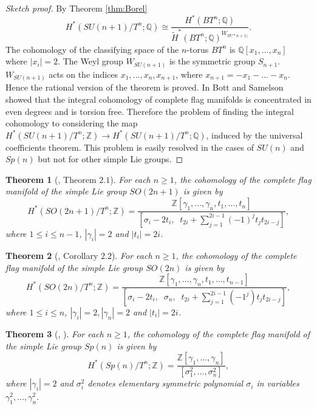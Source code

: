 \documentclass{article}
\theoremstyle{plain}
\newtheorem{thm}{Theorem}[section]
\theoremstyle{definition}
\numberwithin{thm}{section}
\begin{document}
		\begin{proof}[Sketch proof]
			By Theorem \ref{thm:Borel}
			\begin{equation*}
				H^*(SU(n+1)/T^n;\mathbb{Q})\cong \frac{H^*(BT^n;\mathbb{Q})}{\tilde{H}^*(BT^n;\mathbb{Q})^{W_{SU*n+1)}}}.
			\end{equation*}
			The cohomology of the classifying space of the $n$-torus $BT^n$ is $\mathbb{Q}[x_1,\dots,x_n]$ where $|x_i|=2$.
			The Weyl group $W_{SU(n+1)}$ is the symmetric group $S_{n+1}$.
			$W_{SU(n+1)}$ acts on the indices $x_1,\dots,x_n,x_{n+1}$, where $x_{n+1}=-x_1-\dots-x_n$.
			Hence the rational version of the theorem is proved.
			In \cite{AplicationsOfMorse} Bott and Samelson showed that the integral cohomology of complete flag manifolds is concentrated in even degrees and is torsion free.
			Therefore the problem of finding the integral cohomology to considering the map $H^*(SU(n+1)/T^n;\mathbb{Z})\to H^*(SU(n+1)/T^n;\mathbb{Q})$,
			induced by the universal coefficients theorem.
			This problem is easily resolved in the cases of $SU(n)$ and $Sp(n)$ but not for other simple Lie groups.
		\end{proof}

		\begin{thm}[\cite{toda1974}, Theorem $2.1$]\label{thm:H*SUodd}
			For each $n\geq 1$, the cohomology of the complete flag manifold of the simple Lie group $SO(2n+1)$ is given by
			\begin{equation*}
				H^*(SO(2n+1)/T^n;\mathbb{Z})=\frac{\mathbb{Z}[\gamma_1,\dots,\gamma_n,t_1,\dots,t_n]}{[\sigma_i-2t_i, \;\; t_{2i}+\sum_{j=1}^{2i-1}(-1)^jt_jt_{2i-j}]},
			\end{equation*}
			where $1\leq i \leq n-1$, $|\gamma_i|=2$ and $|t_i|=2i$.
		\end{thm}
	
		\begin{thm}[\cite{toda1974}, Corollary $2.2$]\label{thm:H*SOeven}
			For each $n\geq 1$, the cohomology of the complete flag manifold of the simple Lie group $SO(2n)$ is given by
			\begin{equation*}
				H^*(SO(2n)/T^n;\mathbb{Z})=
				\frac{\mathbb{Z}[\gamma_1,\dots,\gamma_n,t_1,\dots,t_{n-1}]}{[\sigma_i-2t_i, \;\; \sigma_n, \;\; t_{2i}+\sum_{j=1}^{2i-1}(-1^j)t_jt_{2i-j}]},
			\end{equation*}
			where $1\leq i \leq n$, $|\gamma_i|=2, |\gamma_n|=2$ and $|t_i|=2i$.
		\end{thm}
		
		\begin{thm}[\cite{Borel}, \cite{AplicationsOfMorse}]\label{thm:H*Sp/T}
			For each $n\geq 1$, the cohomology of the complete flag manifold of the simple Lie group $Sp(n)$ is given by
			\begin{equation*}
				H^*(Sp(n)/T^n;\mathbb{Z})=\frac{\mathbb{Z}[\gamma_1,\dots,\gamma_n]}{[\sigma_1^2,\dots,\sigma_{n}^2]},
			\end{equation*}
			where $|\gamma_i|=2$ and $\sigma_i^2$ denotes elementary symmetric polynomial $\sigma_i$ in variables $\gamma_1^2,\dots,\gamma_n^2$.
		\end{thm}
\end{document}
